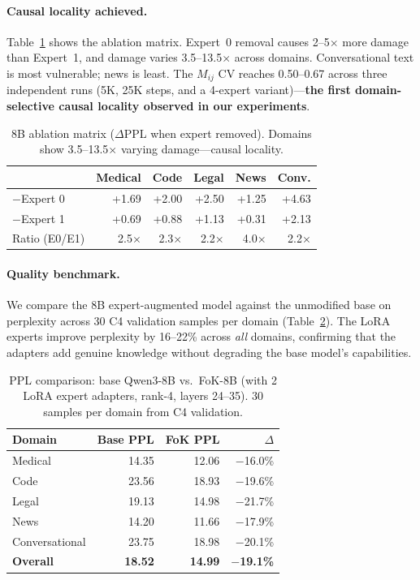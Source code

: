 \documentclass{article}
\begin{document}
\paragraph{Causal locality achieved.}
Table~\ref{tab:8b-mij} shows the ablation matrix. Expert~0 removal causes
2--5$\times$ more damage than Expert~1, and damage varies 3.5--13.5$\times$
across domains. Conversational text is most vulnerable; news is least. The
$M_{ij}$ CV reaches 0.50--0.67 across three independent runs (5K, 25K steps,
and a 4-expert variant)---\textbf{the first domain-selective causal locality
observed in our experiments}.

\begin{table}[h]
\centering
\caption{8B ablation matrix ($\Delta$PPL when expert removed). Domains show
3.5--13.5$\times$ varying damage---causal locality.}
\label{tab:8b-mij}
\begin{tabular}{@{}lrrrrr@{}}
\toprule
 & Medical & Code & Legal & News & Conv. \\
\midrule
$-$Expert 0 & +1.69 & +2.00 & +2.50 & +1.25 & +4.63 \\
$-$Expert 1 & +0.69 & +0.88 & +1.13 & +0.31 & +2.13 \\
\midrule
Ratio (E0/E1) & 2.5$\times$ & 2.3$\times$ & 2.2$\times$ & 4.0$\times$ & 2.2$\times$ \\
\bottomrule
\end{tabular}
\end{table}

\paragraph{Quality benchmark.}
We compare the 8B expert-augmented model against the unmodified base on
perplexity across 30 C4 validation samples per domain
(Table~\ref{tab:8b-quality}). The LoRA experts improve perplexity by
16--22\% across \emph{all} domains, confirming that the adapters add genuine
knowledge without degrading the base model's capabilities.

\begin{table}[h]
\centering
\caption{PPL comparison: base Qwen3-8B vs.\ FoK-8B (with 2 LoRA expert
adapters, rank-4, layers 24--35). 30 samples per domain from C4 validation.}
\label{tab:8b-quality}
\begin{tabular}{@{}lrrr@{}}
\toprule
Domain & Base PPL & FoK PPL & $\Delta$ \\
\midrule
Medical       & 14.35 & 12.06 & $-$16.0\% \\
Code          & 23.56 & 18.93 & $-$19.6\% \\
Legal         & 19.13 & 14.98 & $-$21.7\% \\
News          & 14.20 & 11.66 & $-$17.9\% \\
Conversational& 23.75 & 18.98 & $-$20.1\% \\
\midrule
\textbf{Overall} & \textbf{18.52} & \textbf{14.99} & $-$\textbf{19.1\%} \\
\bottomrule
\end{tabular}
\end{table}
\end{document}
